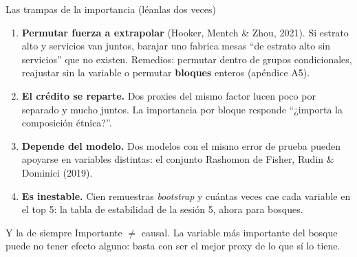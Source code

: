 \documentclass{beamer}
\newcommand{\1}{\mathbb{I}}
\begin{document}
\begin{frame}{Las trampas de la importancia (léanlas dos veces)}
\small
\begin{enumerate}\itemsep2pt
  \item \textbf{Permutar fuerza a extrapolar} (Hooker, Mentch \& Zhou, 2021). Si estrato alto y servicios van juntos, barajar uno fabrica mesas ``de estrato alto sin servicios'' que no existen. Remedios: permutar dentro de grupos condicionales, reajustar sin la variable o permutar \textbf{bloques} enteros (apéndice A5). \pause
  \item \textbf{El crédito se reparte.} Dos proxies del mismo factor lucen poco por separado y mucho juntos. La importancia por bloque responde ``¿importa la composición étnica?''. \pause
  \item \textbf{Depende del modelo.} Dos modelos con el mismo error de prueba pueden apoyarse en variables distintas: el conjunto Rashomon de Fisher, Rudin \& Dominici (2019). \pause
  \item \textbf{Es inestable.} Cien remuestras \emph{bootstrap} y cuántas veces cae cada variable en el top 5: la tabla de estabilidad de la sesión 5, ahora para bosques.
\end{enumerate}
\pause
\begin{block}{Y la de siempre}
Importante $\neq$ causal. La variable más importante del bosque puede no tener efecto alguno: basta con ser el mejor proxy de lo que sí lo tiene.
\end{block}
\end{frame}
\end{document}
